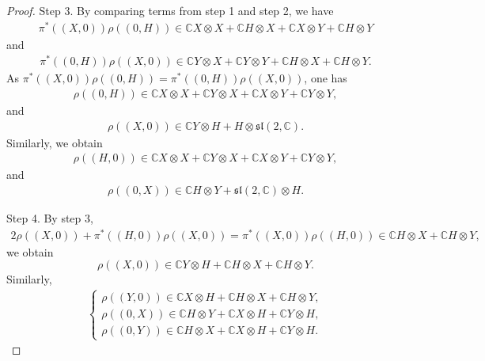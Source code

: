 \documentclass[10pt,a4paper]{amsart}
\begin{document}
\begin{proof}
Step 3. By  comparing terms from  step 1 and step 2, we have
\begin{eqnarray*}
\pi^{\ast}((X,0))\rho((0,H))\in \mathbb{C} X\otimes X+\mathbb{C} H\otimes X+\mathbb{C} X\otimes Y+\mathbb{C} H\otimes Y
\end{eqnarray*}
and
\begin{eqnarray*}
\pi^{\ast}((0,H))\rho((X,0))\in \mathbb{C} Y\otimes X+\mathbb{C} Y\otimes Y+\mathbb{C} H\otimes X+\mathbb{C} H\otimes Y.
\end{eqnarray*}
As $\pi^{\ast}((X,0))\rho((0,H))=\pi^{\ast}((0,H))\rho((X,0))$, one has
\begin{eqnarray*}
\rho((0,H))\in \mathbb{C} X\otimes X+\mathbb{C} Y\otimes X+\mathbb{C} X\otimes Y+\mathbb{C} Y\otimes Y,
\end{eqnarray*}
and
\begin{eqnarray*}
\rho((X,0))\in \mathbb{C}Y\otimes H+H\otimes\mathfrak{sl}(2,\mathbb{C}).
\end{eqnarray*}
Similarly, we obtain
\begin{eqnarray*}
\rho((H,0))\in \mathbb{C} X\otimes X+\mathbb{C} Y\otimes X+\mathbb{C} X\otimes Y+\mathbb{C} Y\otimes Y,
\end{eqnarray*}
and
\begin{eqnarray*}
\rho((0,X))\in  \mathbb{C} H\otimes Y+\mathfrak{sl}(2,\mathbb{C})\otimes H.
\end{eqnarray*}


Step 4. By step 3,
\begin{eqnarray*}
2\rho((X,0))+\pi^{\ast}((H,0))\rho((X,0))=\pi^{\ast}((X,0))\rho((H,0))\in \mathbb{C}H\otimes X+\mathbb{C}H\otimes Y,
\end{eqnarray*}
we obtain
$$\rho((X,0))\in \mathbb{C}Y\otimes H+\mathbb{C}H\otimes X+\mathbb{C}H\otimes Y.$$
Similarly,
\begin{eqnarray*}
\begin{cases}
\rho((Y,0))\in \mathbb{C}X\otimes H+\mathbb{C}H\otimes X+\mathbb{C}H\otimes Y,\\
\rho((0,X))\in \mathbb{C}H\otimes Y+\mathbb{C}X\otimes H+\mathbb{C}Y\otimes H, \\
\rho((0,Y))\in \mathbb{C}H\otimes X+\mathbb{C}X\otimes H+\mathbb{C}Y\otimes H.
\end{cases}
\end{eqnarray*}


\end{proof}
\end{document}
